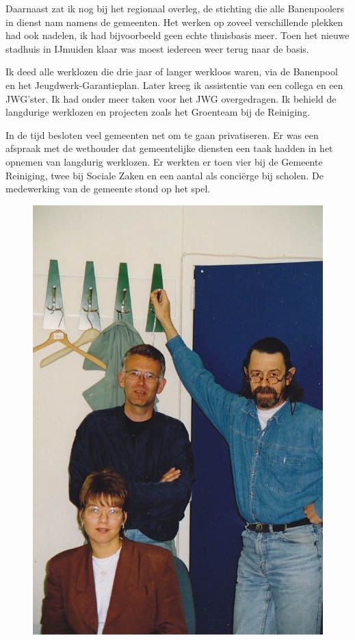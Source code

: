 \documentclass[10pt,twoside, openright]{memoir}
\begin{document}
Daarnaast zat ik nog bij het regionaal overleg, de stichting die alle Banenpoolers in dienst nam namens de gemeenten. Het werken op zoveel verschillende plekken had ook nadelen, ik had bijvoorbeeld geen echte thuisbasis meer. Toen het nieuwe stadhuis in IJmuiden klaar was moest iedereen weer terug naar de basis. 

Ik deed alle werklozen die drie jaar of langer werkloos waren, via de Banenpool en het Jeugdwerk-Garantieplan. Later kreeg ik assistentie van een collega en een JWG’ster. Ik had onder meer taken voor het JWG overgedragen. Ik behield de langdurige werklozen en projecten zoals het Groenteam bij de Reiniging. 

In de tijd besloten veel gemeenten net om te gaan privatiseren. Er was een afspraak met de wethouder dat gemeentelijke diensten een taak hadden in het opnemen van langdurig werklozen. Er werkten er toen vier bij de Gemeente Reiniging, twee bij Sociale Zaken en een aantal als conciërge bij scholen. De medewerking van de gemeente stond op het spel. 

\begin{figure}
\includegraphics[width=\textwidth]{img/ch46/velsen_0002}
\end{figure}
\end{document}
